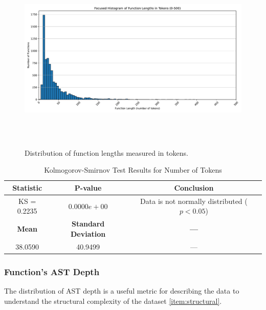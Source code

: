 \documentclass[10pt,english,a4paper]{report}
\begin{document}
\begin{figure}[H]
    \centering
    \includegraphics[width=16cm, height=9cm]{figures/ast_length_merged.pdf}
    \caption{Distribution of function lengths measured in tokens.}
    \label{fig:func_lengths_distr_merged}
\end{figure}


\begin{table}[h!]
    \centering
    \caption{Kolmogorov-Smirnov Test Results for Number of Tokens}
    \label{tab:kolmogorov_smirnov_tokens}
    \begin{tabular}{|c|c|c|}
        \hline
        \textbf{Statistic} & \textbf{P-value} & \textbf{Conclusion} \\
        \hline
        KS = 0.2235 & $0.0000e+00$ & Data is not normally distributed ($p < 0.05$) \\
        \hline
        \textbf{Mean} & \textbf{Standard Deviation} & \textbf{---} \\
        \hline
        38.0590 & 40.9499 & --- \\
        \hline
    \end{tabular}
\end{table}

\subsubsection{Function's AST Depth}

The distribution of AST depth is a useful metric for describing the data
to understand the structural complexity of the dataset \ref{item:structural}.
\end{document}

